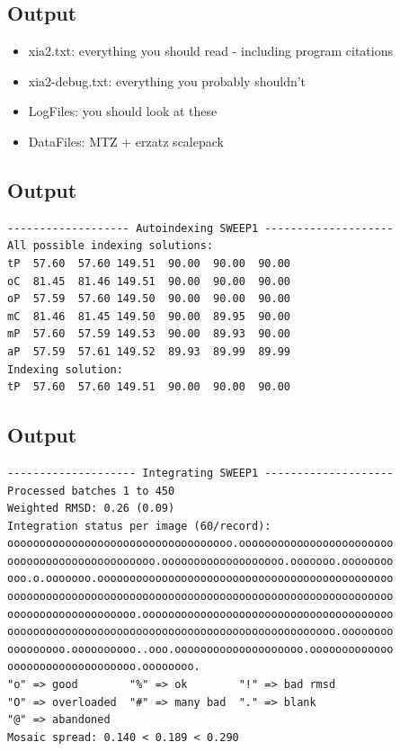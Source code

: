 \documentclass[a4paper, 11pt]{article}
\begin{document}
\subsection{Output}
\begin{itemize}
\item{xia2.txt: everything you should read - including program citations}
\item{xia2-debug.txt: everything you probably shouldn't}
\item{LogFiles: you should look at these}
\item{DataFiles: MTZ + erzatz scalepack}
\end{itemize}

\subsection{Output}
{\small
\begin{verbatim}
------------------- Autoindexing SWEEP1 --------------------
All possible indexing solutions:
tP  57.60  57.60 149.51  90.00  90.00  90.00
oC  81.45  81.46 149.51  90.00  90.00  90.00
oP  57.59  57.60 149.50  90.00  90.00  90.00
mC  81.46  81.45 149.50  90.00  89.95  90.00
mP  57.60  57.59 149.53  90.00  89.93  90.00
aP  57.59  57.61 149.52  89.93  89.99  89.99
Indexing solution:
tP  57.60  57.60 149.51  90.00  90.00  90.00
\end{verbatim}
}

\subsection{Output}
{\small
\begin{verbatim}
-------------------- Integrating SWEEP1 --------------------
Processed batches 1 to 450
Weighted RMSD: 0.26 (0.09)
Integration status per image (60/record):
ooooooooooooooooooooooooooooooooooo.oooooooooooooooooooooooo
ooooooooooooooooooooooo.ooooooooooooooooooo.ooooooo.oooooooo
ooo.o.ooooooo.oooooooooooooooooooooooooooooooooooooooooooooo
oooooooooooooooooooooooooooooooooooooooooooooooooooooooooooo
oooooooooooooooooooo.ooooooooooooooooooooooooooooooooooooooo
ooooooooooooooooooooooooooooooooooooooooooooooooooo.oooooooo
ooooooooo.oooooooooo..ooo.oooooooooooooooooooo.ooooooooooooo
oooooooooooooooooooo.oooooooo.
"o" => good        "%" => ok        "!" => bad rmsd
"O" => overloaded  "#" => many bad  "." => blank
"@" => abandoned
Mosaic spread: 0.140 < 0.189 < 0.290
\end{verbatim}
}
\end{document}

